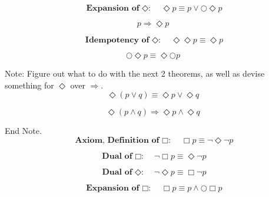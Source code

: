 \documentclass[fleqn, leqno]{article}
\begin{document}
\begin{equation}\label{E:expansionEvent}
\textbf{Expansion of $\Diamond$:}\quad \Diamond p \equiv p \lor \bigcirc\Diamond p
\end{equation}

\begin{equation}\label{E:impEvent}
p \Rightarrow \Diamond p
\end{equation}

\begin{equation}\label{E:IdemEvent}
\textbf{Idempotency of $\Diamond$:}\quad \Diamond\Diamond p \equiv \Diamond p
\end{equation}

\begin{equation}\label{E:dNextEvent}
\bigcirc\Diamond p \equiv \Diamond\bigcirc p
\end{equation}

Note: Figure out what to do with the next 2 theorems, as well as devise something for $\Diamond$ over $\Rightarrow$.\\

\begin{equation}\label{E:distEventOr}
\Diamond(p \lor q) \equiv \Diamond p \lor \Diamond q
\end{equation}

\begin{equation}\label{E:distEventAnd}
\Diamond(p \land q) \Rightarrow \Diamond p \land \Diamond q
\end{equation}

End Note.\\

\begin{equation}\label{E:defAlways}
\textbf{Axiom, Definition of $\Box$:}\quad \Box p \equiv \lnot\Diamond\lnot p
\end{equation}

\begin{equation}\label{E:dualAlways}
\textbf{Dual of $\Box$:}\quad \lnot\Box p \equiv \Diamond\lnot p
\end{equation}

\begin{equation}\label{E:dualEvent}
\textbf{Dual of $\Diamond$:}\quad \lnot\Diamond p \equiv \Box\lnot p
\end{equation}

\begin{equation}\label{E:expansionEvent}
\textbf{Expansion of $\Box$:}\quad \Box p \equiv p \land \bigcirc\Box p
\end{equation}
\end{document}
